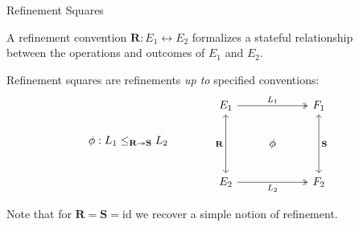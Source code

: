 \documentclass[aspectratio=1610,mathserif]{beamer}
\newcommand{\kw}[1]{\ensuremath{ \mathrm{#1} }}
\begin{document}

\begin{frame}[fragile]{Refinement Squares} %
  \begin{definition}
    A refinement convention $\mathbf{R} : E_1 \leftrightarrow E_2$
    formalizes a stateful relationship \\ between the operations and outcomes
    of $E_1$ and $E_2$.
  \end{definition}

  \pause
  Refinement squares are refinements \emph{up to}
  specified conventions:
  \[
    \phi : L_1 \le_{\mathbf{R} \twoheadrightarrow \mathbf{S}} L_2
    \qquad \qquad
    \begin{tikzcd}
       E_1 \ar[rr, "L_1", twoheadrightarrow]
           \ar[dd, "\mathbf{R}"', leftrightarrow]
       &&
       F_1 \ar[dd, "\mathbf{S}", leftrightarrow]
       \\
       & \phi &
       \\
       E_2 \ar[rr, "L_2"', twoheadrightarrow] && F_2
    \end{tikzcd}
  \]

  \pause
  Note that for $\mathbf{R} = \mathbf{S} = \kw{id}$
  we recover a simple notion of refinement.
\end{frame}
\end{document}
